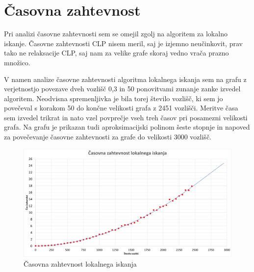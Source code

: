 \documentclass[a4paper, 12 pt]{article}
\theoremstyle{definition}
\theoremstyle{plain}
\theoremstyle{remark}
\begin{document}
\newpage
\section{Časovna zahtevnost} %
Pri analizi časovne zahtevnosti sem se omejil zgolj na algoritem za lokalno iskanje. Časovne zahtevnosti CLP nisem meril, saj je izjemno neučinkovit,  prav tako ne relaksacije CLP, saj nam za velike grafe skoraj vedno vrača prazno množico.

V namen analize časovne zahtevnosti algoritma lokalnega iskanja sem na grafu z verjetnostjo povezave dveh vozlišč 0,3 in 50 ponovitvami zunanje zanke izvedel algoritem. Neodvisna spremenljivka je bila torej število vozlišč, ki sem jo povečeval s korakom 50 do končne velikosti grafa z 2451 vozlišči. Meritve časa sem izvedel trikrat in nato vzel povprečje vseh treh časov pri posamezni velikosti grafa. Na grafu je prikazan tudi aproksimacijski polinom šeste stopnje in napoved za povečevanje časovne zahtevnosti za grafe do velikosti 3000 vozlišč.


\begin{figure}[H]
\centering
  \includegraphics[scale=0.29]{casovna_ zahtevnost_LOKISK.png}
  \caption{Časovna zahtevnost lokalnega iskanja}
  \label{fig:casovna zahtevnost} 
\end{figure}


 

\end{document}
